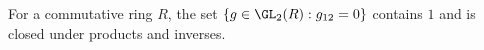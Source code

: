For a commutative ring $R$, the set $\{g\in\GL_2(R):g_{12}=0\}$ contains $1$ and is closed under products and inverses.
